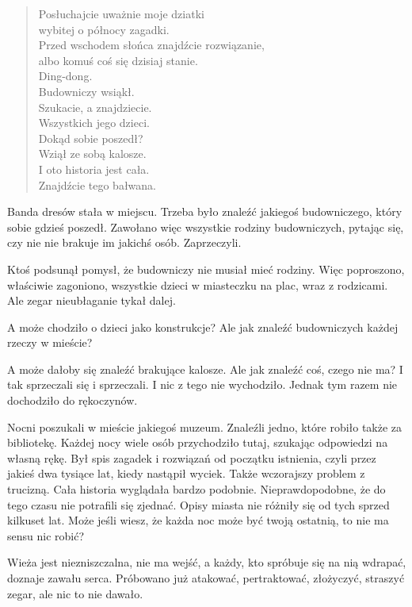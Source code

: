 \begin{sl}
\begin{quote}
Posłuchajcie uważnie moje dziatki \\
wybitej o północy zagadki. \\
Przed wschodem słońca znajdźcie rozwiązanie, \\
albo komuś coś się dzisiaj stanie. \\
Ding-dong. \\
Budowniczy wsiąkł. \\
Szukacie, a znajdziecie. \\
Wszystkich jego dzieci. \\
Dokąd sobie poszedł? \\
Wziął ze sobą kalosze. \\
I oto historia jest cała. \\
Znajdźcie tego bałwana. \\
\end{quote}
\end{sl}

Banda dresów stała w miejscu.
Trzeba było znaleźć jakiegoś budowniczego, który sobie gdzieś poszedł.
Zawołano więc wszystkie rodziny budowniczych, pytając się, czy nie nie brakuje im jakichś osób.
Zaprzeczyli.

Ktoś podsunął pomysł, że budowniczy nie musiał mieć rodziny.
Więc poproszono, właściwie zagoniono, wszystkie dzieci w miasteczku na plac, wraz z rodzicami.
Ale zegar nieubłaganie tykał dalej.

A może chodziło o dzieci jako konstrukcje? Ale jak znaleźć budowniczych każdej rzeczy w mieście?

A może dałoby się znaleźć brakujące kalosze. Ale jak znaleźć coś, czego nie ma?
I tak sprzeczali się i sprzeczali.
I nic z tego nie wychodziło.
Jednak tym razem nie dochodziło do rękoczynów.

Nocni poszukali w mieście jakiegoś muzeum.
Znaleźli jedno, które robiło także za bibliotekę.
Każdej nocy wiele osób przychodziło tutaj, szukając odpowiedzi na własną rękę.
Był spis zagadek i rozwiązań od początku istnienia, czyli przez jakieś dwa tysiące lat, kiedy nastąpił wyciek.
Także wczorajszy problem z trucizną. Cała historia wyglądała bardzo podobnie.
Nieprawdopodobne, że do tego czasu nie potrafili się zjednać.
Opisy miasta nie różniły się od tych sprzed kilkuset lat.
Może jeśli wiesz, że każda noc może być twoją ostatnią, to nie ma sensu nic robić?

Wieża jest niezniszczalna, nie ma wejść, a każdy, kto spróbuje się na nią wdrapać, doznaje zawału serca.
Próbowano już atakować, pertraktować, złożyczyć, straszyć zegar, ale nic to nie dawało.


